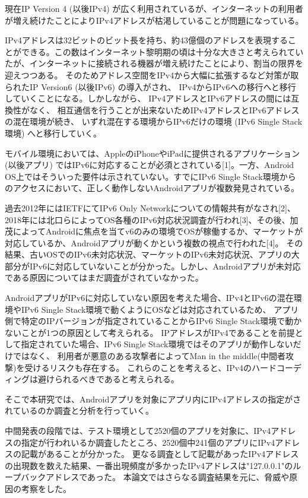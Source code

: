 \documentclass[a4j]{jarticle}
\begin{document}
現在IP Version 4 (以後IPv4) が広く利用されているが、インターネットの利用者が増え続けたことによりIPv4アドレスが枯渇していることが問題になっている。

IPv4アドレスは32ビットのビット長を持ち、約43億個のアドレスを表現することができる。この数はインターネット黎明期の頃は十分な大きさと考えられていたが、インターネットに接続される機器が増え続けたことにより、割当の限界を迎えつつある。
そのためアドレス空間をIPv4から大幅に拡張するなど対策が取られたIP Version6 (以後IPv6) の導入がされ、
IPv4からIPv6への移行へと移行していくことになる。しかしながら、
IPv4アドレスとIPv6アドレスの間には互換性がなく、
相互通信を行うことが出来ないためIPv4アドレスとIPv6アドレスの混在環境が続き、
いずれ混在する環境からIPv6だけの環境 (IPv6 Single Stack環境) へと移行していく。

モバイル環境においては、AppleのiPhoneやiPadに提供されるアプリケーション (以後アプリ) ではIPv6に対応することが必須とされている[1]。一方、Android OS上ではそういった要件は示されていない。すでにIPv6 Single Stack環境からのアクセスにおいて、正しく動作しないAndroidアプリが複数発見されている。

過去2012年にはIETFにてIPv6 Only Networkについての情報共有がなされ[2]、2018年には北口らによってOS各種のIPv6対応状況調査が行われ[3]、その後、加茂によってAndroidに焦点を当てv6のみの環境でOSが稼働するか、マーケットが対応しているか、Androidアプリが動くかという複数の視点で行われた[4]。
その結果、古いOSでのIPv6未対応状況、マーケットのIPv6未対応状況、アプリの大部分がIPv6に対応していないことが分かった。しかし、Androidアプリが未対応である原因についてはまだ調査がされていなかった。

AndroidアプリがIPv6に対応していない原因を考えた場合、IPv4とIPv6の混在環境やIPv6 Single Stack環境で動くようにOSなどは対応されているため、
アプリ側で特定のIPバージョンが指定されていることからIPv6 Single Stack環境で動かないことが1つの原因として考えられる。
IPアドレスがIPv4であることを前提として指定されていた場合、IPv6 Single Stack環境ではそのアプリが動作しないだけではなく、
利用者が悪意のある攻撃者によってMan in the middle(中間者攻撃)を受けるリスクも存在する。
これらのことを考えると、IPv4のハードコーディングは避けられるべきであると考えられる。

そこで本研究では、Androidアプリを対象にアプリ内にIPv4アドレスの指定がされているのか調査と分析を行っていく。

中間発表の段階では、テスト環境として2520個のアプリを対象に、IPv4アドレスの指定が行われいるか調査したところ、2520個中241個のアプリにIPv4アドレスの記載があることが分かった。
更なる調査として記載があったIPv4アドレスの出現数を数えた結果、一番出現頻度が多かったIPv4アドレスは"127.0.0.1"のループバックアドレスであった。
本論文ではさらなる調査結果を元に、脅威や原因の考察をした。
\end{document}

